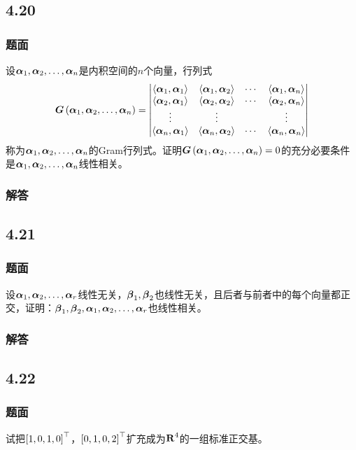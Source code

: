 \documentclass{beamer}
\begin{document}
\subsection*{4.20}
\begin{frame}
    \frametitle{题面}

    设\(\enums{\vecal}{n}\)是内积空间的\(n\)个向量，行列式
    \begin{equation*}
        \gram{\enums{\vecal}{n}}=
        \begin{vmatrix}
            \indot{\vecal_1}{\vecal_1} & \indot{\vecal_1}{\vecal_2} & \cdots & \indot{\vecal_1}{\vecal_n} \\
            \indot{\vecal_2}{\vecal_1} & \indot{\vecal_2}{\vecal_2} & \cdots & \indot{\vecal_2}{\vecal_n} \\
            \vdots                     & \vdots                     &        & \vdots                     \\
            \indot{\vecal_n}{\vecal_1} & \indot{\vecal_n}{\vecal_2} & \cdots & \indot{\vecal_n}{\vecal_n}
        \end{vmatrix}
    \end{equation*}
    称为\(\enums{\vecal}{n}\)的Gram行列式。证明\(\gram{\enums{\vecal}{n}}=0\)的充分必要条件是\(\enums{\vecal}{n}\)线性相关。

\end{frame}

\begin{frame}
    \frametitle{解答}



\end{frame}

\subsection*{4.21}
\begin{frame}
    \frametitle{题面}

    设\(\enums{\vecal}{r}\)线性无关，\(\vecbeta_1,\vecbeta_2\)也线性无关，且后者与前者中的每个向量都正交，证明：\(\vecbeta_1,\vecbeta_2,\enums{\vecal}{r}\)也线性相关。

\end{frame}

\begin{frame}
    \frametitle{解答}



\end{frame}

\subsection*{4.22}
\begin{frame}
    \frametitle{题面}

    试把\(\mat{1,0,1,0}^\top\)，\(\mat{0,1,0,2}^\top\)扩充成为\(\rea^4\)的一组标准正交基。

\end{frame}
\end{document}

